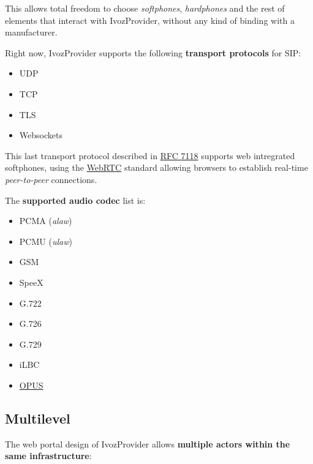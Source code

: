 \documentclass[letterpaper,10pt,english]{sphinxmanual}
\begin{document}
This allows total freedom to choose \emph{softphones}, \emph{hardphones} and the
rest of elements that interact with IvozProvider, without any kind of
binding with a manufacturer.

Right now, IvozProvider supports the following \textbf{transport protocols}
for SIP:
\begin{itemize}
\item {} 
UDP

\item {} 
TCP

\item {} 
TLS

\item {} 
Websockets

\end{itemize}

This last transport protocol described in \href{https://tools.ietf.org/html/rfc7118}{RFC 7118} supports web intregrated
softphones, using the \href{https://webrtc.org/}{WebRTC} standard allowing
browsers to establish real-time \emph{peer-to-peer} connections.

The \textbf{supported audio codec} list is:
\begin{itemize}
\item {} 
PCMA (\emph{alaw})

\item {} 
PCMU (\emph{ulaw})

\item {} 
GSM

\item {} 
SpeeX

\item {} 
G.722

\item {} 
G.726

\item {} 
G.729

\item {} 
iLBC

\item {} 
\href{http://opus-codec.org/}{OPUS}

\end{itemize}


\subsection{Multilevel}
\label{intro/what_is_ivozprovider:multilevel}
The web portal design of IvozProvider allows \textbf{multiple actors within the
same infrastructure}:
\end{document}
